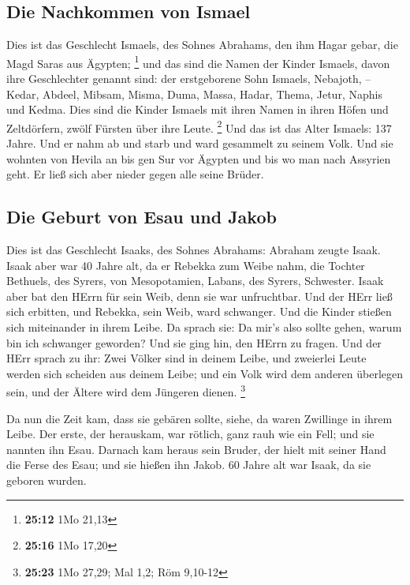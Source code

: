 \hypertarget{die-nachkommen-von-ismael}{%
\subsection{Die Nachkommen von Ismael}\label{die-nachkommen-von-ismael}}

 Dies ist das Geschlecht Ismaels, des Sohnes Abrahams,
den ihm Hagar gebar, die Magd Saras aus Ägypten; \footnote{\textbf{25:12}
  1Mo 21,13}  und das sind die Namen der Kinder Ismaels,
davon ihre Geschlechter genannt sind: der erstgeborene Sohn Ismaels,
Nebajoth, -- Kedar, Abdeel, Mibsam,  Misma, Duma, Massa,
 Hadar, Thema, Jetur, Naphis und Kedma. 
Dies sind die Kinder Ismaels mit ihren Namen in ihren Höfen und
Zeltdörfern, zwölf Fürsten über ihre Leute. \footnote{\textbf{25:16} 1Mo
  17,20}  Und das ist das Alter Ismaels: 137 Jahre. Und
er nahm ab und starb und ward gesammelt zu seinem Volk. 
Und sie wohnten von Hevila an bis gen Sur vor Ägypten und bis wo man
nach Assyrien geht. Er ließ sich aber nieder gegen alle seine Brüder.

\hypertarget{die-geburt-von-esau-und-jakob}{%
\subsection{Die Geburt von Esau und
Jakob}\label{die-geburt-von-esau-und-jakob}}

 Dies ist das Geschlecht Isaaks, des Sohnes Abrahams:
Abraham zeugte Isaak.  Isaak aber war 40 Jahre alt, da er
Rebekka zum Weibe nahm, die Tochter Bethuels, des Syrers, von
Mesopotamien, Labans, des Syrers, Schwester.  Isaak aber
bat den HErrn für sein Weib, denn sie war unfruchtbar. Und der HErr ließ
sich erbitten, und Rebekka, sein Weib, ward schwanger. 
Und die Kinder stießen sich miteinander in ihrem Leibe. Da sprach sie:
Da mir's also sollte gehen, warum bin ich schwanger geworden? Und sie
ging hin, den HErrn zu fragen.  Und der HErr sprach zu
ihr: Zwei Völker sind in deinem Leibe, und zweierlei Leute werden sich
scheiden aus deinem Leibe; und ein Volk wird dem anderen überlegen sein,
und der Ältere wird dem Jüngeren dienen. \footnote{\textbf{25:23} 1Mo
  27,29; Mal 1,2; Röm 9,10-12}

 Da nun die Zeit kam, dass sie gebären sollte, siehe, da
waren Zwillinge in ihrem Leibe.  Der erste, der
herauskam, war rötlich, ganz rauh wie ein Fell; und sie nannten ihn
Esau.  Darnach kam heraus sein Bruder, der hielt mit
seiner Hand die Ferse des Esau; und sie hießen ihn Jakob. 60 Jahre alt
war Isaak, da sie geboren wurden.

